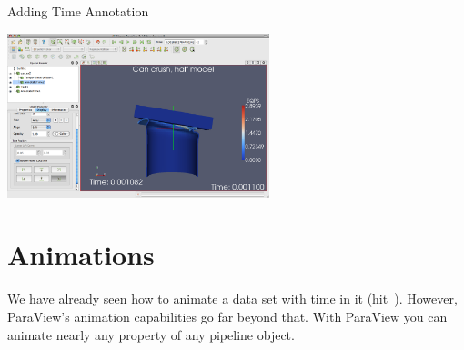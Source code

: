 \begin{exercise}{Adding Time Annotation}
  \begin{inlinefig}
    \includegraphics[width=3in]{images/AnnotateTimeFilter}
  \end{inlinefig}
\end{exercise}


\section{Animations}

We have already seen how to animate a data set with time in it
(hit~\vcrPlay).  However, ParaView’s animation capabilities go far beyond
that.  With ParaView you can animate nearly any property of any pipeline
object.

